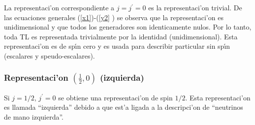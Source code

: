 La representaci'on correspondiente a $j=j^{\prime }=0$ es la
representaci'on trivial. De las ecuaciones generales (\ref{x1})-(\ref{y2}%
) se observa que la representaci'on es unidimensional y que todos los
generadores son identicamente nulos. Por lo tanto, toda TL es representada
trivialmente por la identidad (unidimensional). Esta representaci'on es
de sp{\'\i}n cero y es usada para describir particular sin sp{\'\i}n
(escalares y speudo-escalares).

\subsubsection{Representaci'on $(\frac{1}{2},0)$ (izquierda)\label{left}}

Si $j={1}/{2}$, $j^{\prime }=0$ se obtiene una representaci'on de
spin $1/2$. Esta representaci'on es llamada ``izquierda'' debido
a que est'a ligada a la descripci'on de ``neutrinos de mano izquierda''.

